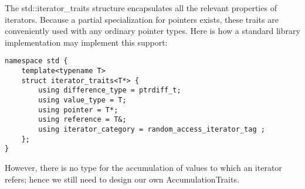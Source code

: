 The std::iterator\_traits structure encapsulates all the relevant properties of iterators. Because a partial specialization for pointers exists, these traits are conveniently used with any ordinary pointer types. Here is how a standard library implementation may implement this support:

\begin{lstlisting}[style=styleCXX]
namespace std {
	template<typename T>
	struct iterator_traits<T*> {
		using difference_type = ptrdiff_t;
		using value_type = T;
		using pointer = T*;
		using reference = T&;
		using iterator_category = random_access_iterator_tag ;
	};
}
\end{lstlisting}

However, there is no type for the accumulation of values to which an iterator refers; hence we still need to design our own AccumulationTraits.









